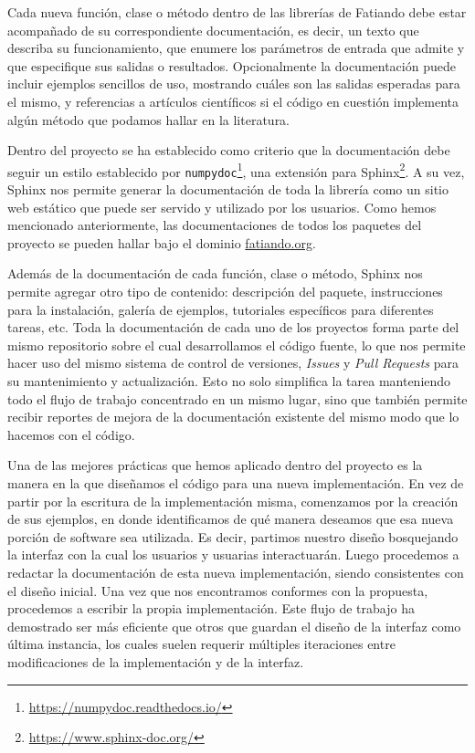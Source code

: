 Cada nueva función, clase o método dentro de las librerías de Fatiando debe
estar acompañado de su correspondiente documentación, es decir, un texto que
describa su funcionamiento, que enumere los parámetros de entrada que admite
y que especifique sus salidas o resultados.
Opcionalmente la documentación puede incluir ejemplos sencillos de uso,
mostrando cuáles son las salidas esperadas para el mismo, y referencias
a artículos científicos si el código en cuestión implementa algún método que
podamos hallar en la literatura.

Dentro del proyecto se ha establecido como criterio que la documentación debe
seguir un estilo establecido por
\texttt{numpydoc}\footnote{\url{https://numpydoc.readthedocs.io/}},
una extensión para Sphinx\footnote{\url{https://www.sphinx-doc.org/}}.
A su vez, Sphinx nos permite generar la documentación de toda la librería como
un sitio web estático que puede ser servido y utilizado por los usuarios.
Como hemos mencionado anteriormente, las documentaciones de todos los paquetes
del proyecto se pueden hallar bajo el dominio
\href{https://www.fatiando.org}{fatiando.org}.

Además de la documentación de cada función, clase o método, Sphinx nos permite
agregar otro tipo de contenido: descripción del paquete, instrucciones
para la instalación, galería de ejemplos, tutoriales específicos para
diferentes tareas, etc.
Toda la documentación de cada uno de los proyectos forma parte del mismo
repositorio sobre el cual desarrollamos el código fuente, lo que nos permite
hacer uso del mismo sistema de control de versiones, \emph{Issues} y \emph{Pull
Requests} para su mantenimiento y actualización.
Esto no solo simplifica la tarea manteniendo todo el flujo de trabajo
concentrado en un mismo lugar, sino que también permite recibir reportes de
mejora de la documentación existente del mismo modo que lo hacemos con el
código.

Una de las mejores prácticas que hemos aplicado dentro del proyecto es la
manera en la que diseñamos el código para una nueva implementación.
En vez de partir por la escritura de la implementación misma, comenzamos por la
creación de sus ejemplos, en donde identificamos de qué manera deseamos que esa
nueva porción de software sea utilizada.
Es decir, partimos nuestro diseño bosquejando la interfaz con la cual los
usuarios y usuarias interactuarán.
Luego procedemos a redactar la documentación de esta nueva implementación,
siendo consistentes con el diseño inicial.
Una vez que nos encontramos conformes con la propuesta, procedemos a escribir
la propia implementación.
Este flujo de trabajo ha demostrado ser más eficiente que otros que guardan el
diseño de la interfaz como última instancia, los cuales suelen requerir
múltiples iteraciones entre modificaciones de la implementación y de la
interfaz.


